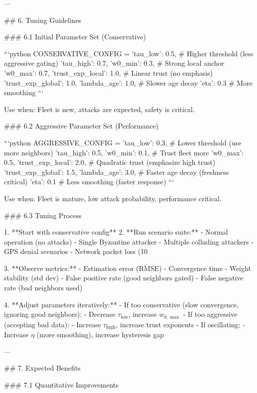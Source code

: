 ---

## 6. Tuning Guidelines

### 6.1 Initial Parameter Set (Conservative)

```python
CONSERVATIVE_CONFIG = {
    'tau_low': 0.5,              # Higher threshold (less aggressive gating)
    'tau_high': 0.7,
    'w0_min': 0.3,               # Strong local anchor
    'w0_max': 0.7,
    'trust_exp_local': 1.0,      # Linear trust (no emphasis)
    'trust_exp_global': 1.0,
    'lambda_age': 1.0,           # Slower age decay
    'eta': 0.3                   # More smoothing
}
```

Use when: Fleet is new, attacks are expected, safety is critical.

### 6.2 Aggressive Parameter Set (Performance)

```python
AGGRESSIVE_CONFIG = {
    'tau_low': 0.3,              # Lower threshold (use more neighbors)
    'tau_high': 0.5,
    'w0_min': 0.1,               # Trust fleet more
    'w0_max': 0.5,
    'trust_exp_local': 2.0,      # Quadratic trust (emphasize high trust)
    'trust_exp_global': 1.5,
    'lambda_age': 3.0,           # Faster age decay (freshness critical)
    'eta': 0.1                   # Less smoothing (faster response)
}
```

Use when: Fleet is mature, low attack probability, performance critical.

### 6.3 Tuning Process

1. **Start with conservative config**
2. **Run scenario suite:**
   - Normal operation (no attacks)
   - Single Byzantine attacker
   - Multiple colluding attackers
   - GPS denial scenarios
   - Network packet loss (10%

3. **Observe metrics:**
   - Estimation error (RMSE)
   - Convergence time
   - Weight stability (std dev)
   - False positive rate (good neighbors gated)
   - False negative rate (bad neighbors used)

4. **Adjust parameters iteratively:**
   - If too conservative (slow convergence, ignoring good neighbors):
     - Decrease \(\tau_{\text{low}}\), increase \(w_{0,\max}\)
   - If too aggressive (accepting bad data):
     - Increase \(\tau_{\text{high}}\), increase trust exponents
   - If oscillating:
     - Increase \(\eta\) (more smoothing), increase hysteresis gap

---

## 7. Expected Benefits

### 7.1 Quantitative Improvements

